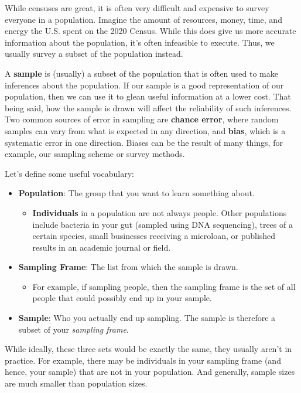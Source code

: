 \documentclass[
  letterpaper,
  DIV=11,
  numbers=noendperiod]{scrreprt}
\providecommand{\tightlist}{%
  \setlength{\itemsep}{0pt}\setlength{\parskip}{0pt}}\usepackage{longtable,booktabs,array}
\begin{document}
While censuses are great, it is often very difficult and expensive to
survey everyone in a population. Imagine the amount of resources, money,
time, and energy the U.S. spent on the 2020 Census. While this does give
us more accurate information about the population, it's often infeasible
to execute. Thus, we usually survey a subset of the population instead.

A \textbf{sample} is (usually) a subset of the population that is often
used to make inferences about the population. If our sample is a good
representation of our population, then we can use it to glean useful
information at a lower cost. That being said, how the sample is drawn
will affect the reliability of such inferences. Two common sources of
error in sampling are \textbf{chance error}, where random samples can
vary from what is expected in any direction, and \textbf{bias}, which is
a systematic error in one direction. Biases can be the result of many
things, for example, our sampling scheme or survey methods.

Let's define some useful vocabulary:

\begin{itemize}
\tightlist
\item
  \textbf{Population}: The group that you want to learn something about.

  \begin{itemize}
  \tightlist
  \item
    \textbf{Individuals} in a population are not always people. Other
    populations include bacteria in your gut (sampled using DNA
    sequencing), trees of a certain species, small businesses receiving
    a microloan, or published results in an academic journal or field.
  \end{itemize}
\item
  \textbf{Sampling Frame}: The list from which the sample is drawn.

  \begin{itemize}
  \tightlist
  \item
    For example, if sampling people, then the sampling frame is the set
    of all people that could possibly end up in your sample.
  \end{itemize}
\item
  \textbf{Sample}: Who you actually end up sampling. The sample is
  therefore a subset of your \emph{sampling frame}.
\end{itemize}

While ideally, these three sets would be exactly the same, they usually
aren't in practice. For example, there may be individuals in your
sampling frame (and hence, your sample) that are not in your population.
And generally, sample sizes are much smaller than population sizes.
\end{document}
